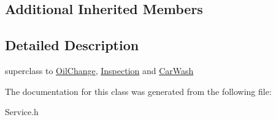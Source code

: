 \subsection*{Additional Inherited Members}


\subsection{Detailed Description}
superclass to \hyperlink{class_oil_change}{Oil\+Change}, \hyperlink{class_inspection}{Inspection} and \hyperlink{class_car_wash}{Car\+Wash} 

The documentation for this class was generated from the following file\+:\begin{DoxyCompactItemize}
\item 
Service.\+h\end{DoxyCompactItemize}
